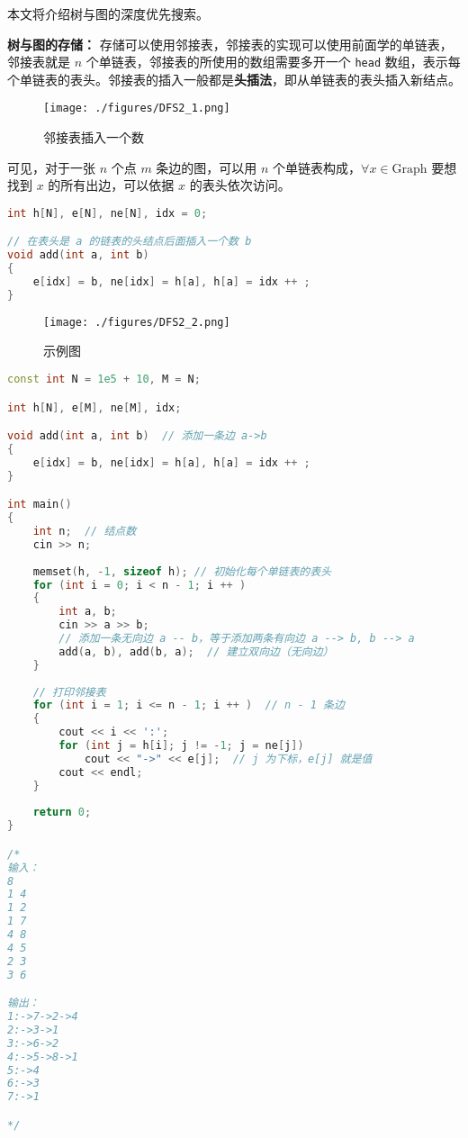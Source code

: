 

本文将介绍树与图的深度优先搜索。

\textbf{树与图的存储：}
存储可以使用邻接表，邻接表的实现可以使用前面学的单链表，邻接表就是 $n$ 个单链表，邻接表的所使用的数组需要多开一个 \verb|head| 数组，表示每个单链表的表头。邻接表的插入一般都是\textbf{头插法}，即从单链表的表头插入新结点。

\begin{figure}[ht]
\centering
\texttt{[image: ./figures/DFS2\_1.png]}
\caption{邻接表插入一个数} \label{DFS2_fig1}
\end{figure}

可见，对于一张 $n$ 个点 $m$ 条边的图，可以用 $n$ 个单链表构成，$\forall x\in \text{Graph}$ 要想找到 $x$ 的所有出边，可以依据 $x$ 的表头依次访问。

\begin{lstlisting}[language=cpp]
int h[N], e[N], ne[N], idx = 0;

// 在表头是 a 的链表的头结点后面插入一个数 b
void add(int a, int b)
{
    e[idx] = b, ne[idx] = h[a], h[a] = idx ++ ;
}
\end{lstlisting}

\begin{figure}[ht]
\centering
\texttt{[image: ./figures/DFS2\_2.png]}
\caption{示例图} \label{DFS2_fig2}
\end{figure}

\begin{lstlisting}[language=cpp]
const int N = 1e5 + 10, M = N;

int h[N], e[M], ne[M], idx;

void add(int a, int b)  // 添加一条边 a->b
{
    e[idx] = b, ne[idx] = h[a], h[a] = idx ++ ;
}

int main()
{
    int n;  // 结点数
    cin >> n;
    
    memset(h, -1, sizeof h); // 初始化每个单链表的表头
    for (int i = 0; i < n - 1; i ++ )
    {
        int a, b;
        cin >> a >> b;
        // 添加一条无向边 a -- b，等于添加两条有向边 a --> b, b --> a
        add(a, b), add(b, a);  // 建立双向边（无向边）
    }
    
    // 打印邻接表
    for (int i = 1; i <= n - 1; i ++ )  // n - 1 条边
    {
        cout << i << ':';
        for (int j = h[i]; j != -1; j = ne[j])
            cout << "->" << e[j];  // j 为下标，e[j] 就是值
        cout << endl;
    }
    
    return 0;
}

/*
输入：
8
1 4
1 2
1 7
4 8
4 5
2 3
3 6

输出：
1:->7->2->4
2:->3->1
3:->6->2
4:->5->8->1
5:->4
6:->3
7:->1

*/
\end{lstlisting}

